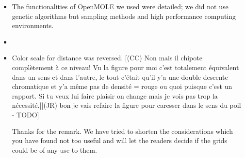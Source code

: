 \documentclass[11pt,a4paper,sans]{moderncv}        %
\begin{document}
\begin{itemize}
	\item The functionalities of OpenMOLE we used were detailed; we did not use genetic algorithms but sampling methods and high performance computing environments.
	
	\item {}
	
    
	\item Color scale for distance was reversed.
    [(CC) Non mais il chipote complètement à ce niveau! Vu la figure pour moi c'est totalement équivalent dans un sens et dans l'autre, le tout c'était qu'il y'a une double descente chromatique et y'a même pas de densité = rouge ou quoi puisque c'est un rapport. Si tu veux lui faire plaisir on change mais je vois pas trop la nécessité.][(JR) bon je vais refaire la figure pour caresser dans le sens du poil - TODO]
	
	Thanks for the remark. We have tried to shorten the considerations which you have found not too useful and will let the readers decide if the grids could be of any use to them.
    
\end{itemize}
\end{document}
